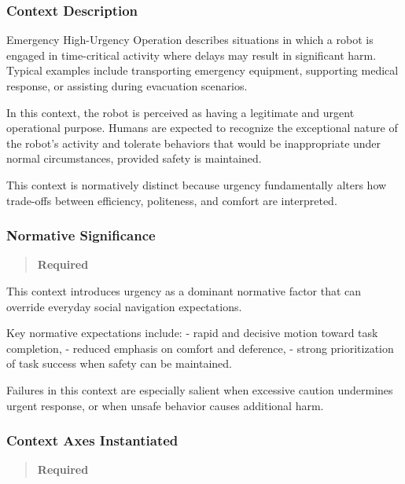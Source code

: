 \documentclass[utf8]{frontiers_suppmat} %
\begin{document}
\subsubsection{Context Description}\label{context-description}

Emergency High-Urgency Operation describes situations in which a robot
is engaged in time-critical activity where delays may result in
significant harm. Typical examples include transporting emergency
equipment, supporting medical response, or assisting during evacuation
scenarios.

In this context, the robot is perceived as having a legitimate and
urgent operational purpose. Humans are expected to recognize the
exceptional nature of the robot's activity and tolerate behaviors that
would be inappropriate under normal circumstances, provided safety is
maintained.

This context is normatively distinct because urgency fundamentally
alters how trade-offs between efficiency, politeness, and comfort are
interpreted.

\subsubsection{Normative Significance}\label{normative-significance}

\begin{quote}
\textbf{Required}
\end{quote}

This context introduces urgency as a dominant normative factor that can
override everyday social navigation expectations.

Key normative expectations include: - rapid and decisive motion toward
task completion, - reduced emphasis on comfort and deference, - strong
prioritization of task success when safety can be maintained.

Failures in this context are especially salient when excessive caution
undermines urgent response, or when unsafe behavior causes additional
harm.

\subsubsection{Context Axes Instantiated}\label{context-axes-instantiated}

\begin{quote}
\textbf{Required}
\end{quote}

\label{cultural-context}
\end{document}
